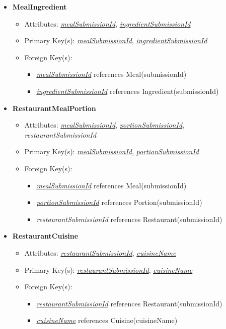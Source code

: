 \begin{itemize}
        \item \textbf{MealIngredient}
        \begin{itemize}
            \item Attributes: \underline{\textit{mealSubmissionId}}, \underline{\textit{ingredientSubmissionId}}
            \item Primary Key(s): \underline{\textit{mealSubmissionId}}, \underline{\textit{ingredientSubmissionId}}
            \item Foreign Key(s): 
                \begin{itemize}
                    \item \underline{\textit{mealSubmissionId}} references Meal(submissionId)
                    \item \underline{\textit{ingredientSubmissionId}} references Ingredient(submissionId)
                \end{itemize}   
        \end{itemize}

        \item \textbf{RestaurantMealPortion}
        \begin{itemize}
            \item Attributes: \underline{\textit{mealSubmissionId}}, \underline{\textit{portionSubmissionId}}, \textit{restaurantSubmissionId}
            \item Primary Key(s): \underline{\textit{mealSubmissionId}}, \underline{\textit{portionSubmissionId}}
            \item Foreign Key(s):
            \begin{itemize}
                \item \underline{\textit{mealSubmissionId}} references Meal(submissionId)
                \item \underline{\textit{portionSubmissionId}} references Portion(submissionId)
                \item \textit{restaurantSubmissionId} references Restaurant(submissionId)
            \end{itemize}            
        \end{itemize}

        \item \textbf{RestaurantCuisine}
        \begin{itemize}
            \item Attributes: \underline{\textit{restaurantSubmissionId}}, \underline{\textit{cuisineName}}
            \item Primary Key(s): \underline{\textit{restaurantSubmissionId}}, \underline{\textit{cuisineName}}
            \item Foreign Key(s): 
                \begin{itemize}
                    \item \underline{\textit{restaurantSubmissionId}} references Restaurant(submissionId)
                    \item \underline{\textit{cuisineName}} references Cuisine(cuisineName)
                \end{itemize}   
        \end{itemize}


\end{itemize}
